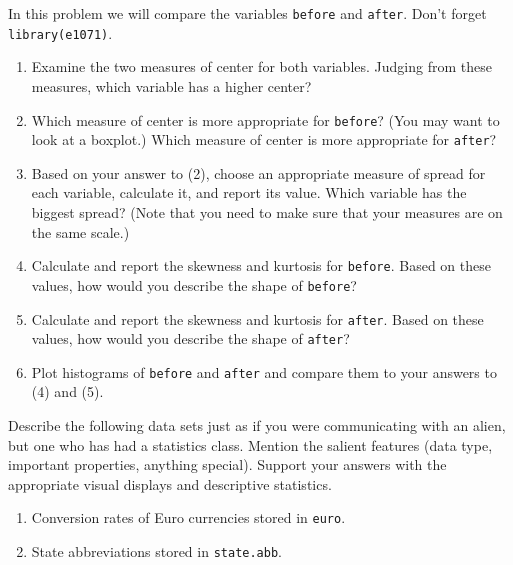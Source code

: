 \documentclass[captions=tableheading]{scrbook}
\begin{document}
\begin{xca}
In this problem we will compare the variables \texttt{before} and \texttt{after}. Don't forget \texttt{library(e1071)}.
\begin{enumerate}
\item Examine the two measures of center for both variables. Judging from these measures, which variable has a higher center?
\item Which measure of center is more appropriate for \texttt{before}? (You may want to look at a boxplot.) Which measure of center is more appropriate for \texttt{after}?
\item Based on your answer to (2), choose an appropriate measure of spread for each variable, calculate it, and report its value. Which variable has the biggest spread? (Note that you need to make sure that your measures are on the same scale.)
\item Calculate and report the skewness and kurtosis for \texttt{before}. Based on these values, how would you describe the shape of \texttt{before}?
\item Calculate and report the skewness and kurtosis for \texttt{after}. Based on these values, how would you describe the shape of \texttt{after}?
\item Plot histograms of \texttt{before} and \texttt{after} and compare them to your answers to (4) and (5).
\end{enumerate}

\end{xca}

\begin{xca}
Describe the following data sets just as if you were communicating with an alien, but one who has had a statistics class. Mention the salient features (data type, important properties, anything special). Support your answers with the appropriate visual displays and descriptive statistics.
\begin{enumerate}
\item Conversion rates of Euro currencies stored in \texttt{euro}.
\item State abbreviations stored in \texttt{state.abb}.
\end{enumerate}

\end{xca}
\end{document}
